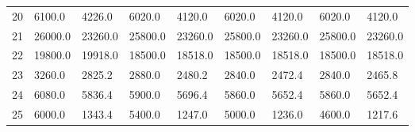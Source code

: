 \begin{tabular}{|r|l|l|l|l|l|l|l|l|}
  20 & 6100.0 & 4226.0 & 6020.0 & 4120.0 & 6020.0 & 4120.0 & 6020.0 & 4120.0 \\ 
  21 & 26000.0 & 23260.0 & 25800.0 & 23260.0 & 25800.0 & 23260.0 & 25800.0 & 23260.0 \\ 
  22 & 19800.0 & 19918.0 & 18500.0 & 18518.0 & 18500.0 & 18518.0 & 18500.0 & 18518.0 \\ 
  23 & 3260.0 & 2825.2 & 2880.0 & 2480.2 & 2840.0 & 2472.4 & 2840.0 & 2465.8 \\ 
  24 & 6080.0 & 5836.4 & 5900.0 & 5696.4 & 5860.0 & 5652.4 & 5860.0 & 5652.4 \\ 
  25 & 6000.0 & 1343.4 & 5400.0 & 1247.0 & 5000.0 & 1236.0 & 4600.0 & 1217.6 \\ 
\end{tabular}
